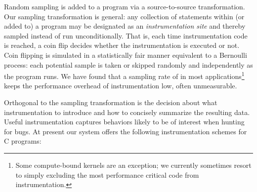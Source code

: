 \documentclass[final]{sigplanconf}
\begin{document}
Random sampling is added to a program via a source-to-source
transformation.  Our sampling transformation is general: any
collection of statements within (or added to) a program may be
designated as an \emph{instrumentation site} and thereby sampled instead of run
unconditionally.  That is, each time instrumentation code is reached,
a coin flip decides whether the instrumentation is executed or not.
Coin flipping is simulated in a statistically fair manner equivalent
to a Bernoulli process: each potential sample is taken or skipped
randomly and independently as the program runs.  We have found that a
sampling rate of  in most applications\footnote{Some compute-bound kernels are an exception; we currently sometimes resort to simply
excluding the most performance critical code from instrumentation.} keeps the performance overhead of instrumentation low, often unmeasurable.

Orthogonal to the sampling transformation is the decision about what
instrumentation to introduce and how to concisely summarize the
resulting data.  Useful instrumentation captures behaviors likely to
be of interest when hunting for bugs.  At present our system offers
the following instrumentation schemes for C programs:
\end{document}
